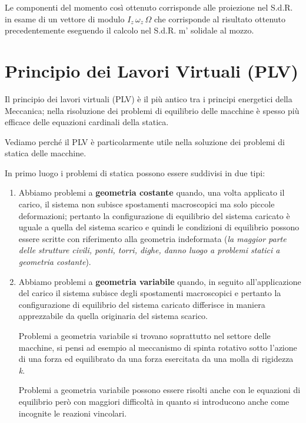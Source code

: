 	
	Le componenti del momento così ottenuto corrisponde alle proiezione nel S.d.R. in esame di un vettore di modulo $I_z\,\omega_z\,\Omega$ che corrisponde al risultato ottenuto precedentemente eseguendo il calcolo nel S.d.R. m' solidale al mozzo.
	
	\section{Principio dei Lavori Virtuali (PLV)}
	
	Il principio dei lavori virtuali (PLV) è il più antico tra i principi energetici della Meccanica; nella risoluzione dei problemi di equilibrio delle macchine è spesso più efficace delle equazioni cardinali della statica.
	
	Vediamo perché il PLV è particolarmente utile nella soluzione dei problemi di statica delle macchine.
	
	In primo luogo i problemi di statica possono essere suddivisi in due tipi:
	\begin{enumerate}
		\item Abbiamo problemi a \textbf{geometria costante} quando, una volta applicato il carico, il sistema non subisce spostamenti macroscopici ma solo piccole deformazioni; pertanto la configurazione di equilibrio del sistema caricato è uguale a quella del sistema scarico e quindi le condizioni di equilibrio possono essere scritte con riferimento alla geometria indeformata (\emph{la maggior parte delle strutture civili, ponti, torri, dighe, danno luogo a problemi statici a geometria costante}).
		
		\item Abbiamo problemi a \textbf{geometria variabile} quando, in seguito all'applicazione del carico il sistema subisce degli spostamenti macroscopici e pertanto la configurazione di equilibrio del sistema caricato differisce in maniera apprezzabile da quella originaria del sistema scarico.
		
		Problemi a geometria variabile si trovano soprattutto nel settore delle macchine, si pensi ad esempio al meccanismo di spinta rotativo sotto l'azione di una forza ed equilibrato da una forza esercitata da una molla di rigidezza \emph{k}.
		
		Problemi a geometria variabile possono essere risolti anche con le equazioni di equilibrio però con maggiori difficoltà in quanto si introducono anche come incognite le reazioni vincolari.
	\end{enumerate}
	
